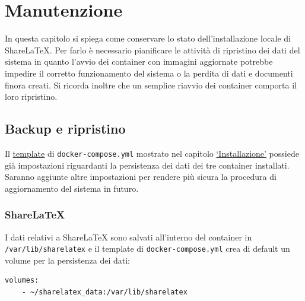 \chapter{Manutenzione}
\label{Manutenzione}
\thispagestyle{plain}

In questa capitolo si spiega come conservare lo stato dell'installazione locale di ShareLaTeX. Per farlo è necessario pianificare le attività di ripristino dei dati del sistema in quanto l'avvio dei container con immagini aggiornate potrebbe impedire il corretto funzionamento del sistema o la perdita di dati e documenti finora creati. Si ricorda inoltre che un semplice riavvio dei container comporta il loro ripristino.

\section{Backup e ripristino}
Il \hyperref[code:docker-compose.yml]{template} di \verb|docker-compose.yml| mostrato nel capitolo \hyperref[Installazione]{\enquote*{Installazione}} possiede già impostazioni riguardanti la persistenza dei dati dei tre container installati. Saranno aggiunte altre impostazioni per rendere più sicura la procedura di aggiornamento del sistema in futuro.

\subsection{ShareLaTeX}
I dati relativi a ShareLaTeX sono salvati all'interno del container in \verb|/var/lib/sharelatex| e il template di \verb|docker-compose.yml| crea di default un volume per la persistenza dei dati:
\begin{lstlisting}
volumes:
    - ~/sharelatex_data:/var/lib/sharelatex
\end{lstlisting}

